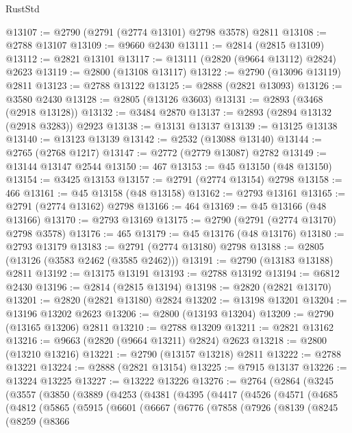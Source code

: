 \begin{lexlean}{RustStd}
\begin{coremodule}
@13107 := @2790 (@2791 (@2774 @13101) @2798 @3578) @2811
@13108 := @2788 @13107
@13109 := @9660 @2430
@13111 := @2814 (@2815 @13109)
@13112 := @2821 @13101
@13117 := @13111 (@2820 (@9664 @13112) @2824) @2623
@13119 := @2800 (@13108 @13117)
@13122 := @2790 (@13096 @13119) @2811
@13123 := @2788 @13122
@13125 := @2888 (@2821 @13093)
@13126 := @3580 @2430
@13128 := @2805 (@13126 @3603)
@13131 := @2893 (@3468 (@2918 @13128))
@13132 := @3484 @2870
@13137 := @2893 (@2894 @13132 (@2918 @3283)) @2923
@13138 := @13131 @13137
@13139 := @13125 @13138
@13140 := @13123 @13139
@13142 := @2532 (@13088 @13140)
@13144 := @2765 (@2768 @1217)
@13147 := @2772 (@2779 @13087) @2782
@13149 := @13144 @13147 @2544
@13150 := 467
@13153 := @45 @13150 (@48 @13150)
@13154 := @3425 @13153
@13157 := @2791 (@2774 @13154) @2798
@13158 := 466
@13161 := @45 @13158 (@48 @13158)
@13162 := @2793 @13161
@13165 := @2791 (@2774 @13162) @2798
@13166 := 464
@13169 := @45 @13166 (@48 @13166)
@13170 := @2793 @13169
@13175 := @2790 (@2791 (@2774 @13170) @2798 @3578)
@13176 := 465
@13179 := @45 @13176 (@48 @13176)
@13180 := @2793 @13179
@13183 := @2791 (@2774 @13180) @2798
@13188 := @2805 (@13126 (@3583 @2462 (@3585 @2462)))
@13191 := @2790 (@13183 @13188) @2811
@13192 := @13175 @13191
@13193 := @2788 @13192
@13194 := @6812 @2430
@13196 := @2814 (@2815 @13194)
@13198 := @2820 (@2821 @13170)
@13201 := @2820 (@2821 @13180) @2824
@13202 := @13198 @13201
@13204 := @13196 @13202 @2623
@13206 := @2800 (@13193 @13204)
@13209 := @2790 (@13165 @13206) @2811
@13210 := @2788 @13209
@13211 := @2821 @13162
@13216 := @9663 (@2820 (@9664 @13211) @2824) @2623
@13218 := @2800 (@13210 @13216)
@13221 := @2790 (@13157 @13218) @2811
@13222 := @2788 @13221
@13224 := @2888 (@2821 @13154)
@13225 := @7915 @13137
@13226 := @13224 @13225
@13227 := @13222 @13226
@13276 := @2764
    (@2864
      (@3245
        (@3557
          (@3850
            (@3889
              (@4253
                (@4381
                  (@4395
                    (@4417
                      (@4526
                        (@4571
                          (@4685
                            (@4812
                              (@5865
                                (@5915
                                  (@6601
                                    (@6667
                                      (@6776
                                        (@7858
                                          (@7926
                                            (@8139
                                              (@8245
                                                (@8259
                                                  (@8366

\end{coremodule}
\end{lexlean}
